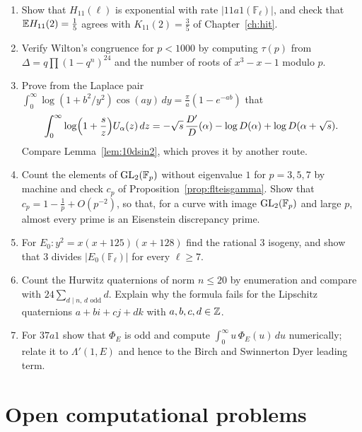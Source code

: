\begin{enumerate}
\item Show that $H_{11}(\ell)$ is exponential with rate $|11a1(\mathbb F_\ell)|$, and check that $\mathbb{E} H_{11}(2)=\frac15$ agrees with $K_{11}(2)=\frac35$ of Chapter~\ref{ch:hit}.
\item Verify Wilton's congruence for $p<1000$ by computing $\tau(p)$ from $\Delta=q\prod(1-q^n)^{24}$ and the number of roots of $x^3-x-1$ modulo $p$.
\item Prove from the Laplace pair $\int_0^\infty\log(1+b^2/y^2)\cos(ay)\,dy=\frac\pi a(1-e^{-ab})$ that\[\int_0^\infty\log\Bigl(1+\frac sz\Bigr)U_\alpha(z)\,dz=-\sqrt s\,\frac{D'}D(\alpha)-\log D(\alpha)+\log D(\alpha+\sqrt s).\]Compare Lemma~\ref{lem:10dsin2}, which proves it by another route.
\item Count the elements of $\mathrm{GL}_2(\mathbb F_p)$ without eigenvalue $1$ for $p=3,5,7$ by machine and check $c_p$ of Proposition~\ref{prop:flteisgamma}. Show that $c_p=1-\frac1p+O(p^{-2})$, so that, for a curve with image $\mathrm{GL}_2(\mathbb F_p)$ and large $p$, almost every prime is an Eisenstein discrepancy prime.
\item For $E_0:y^2=x(x+125)(x+128)$ find the rational $3$ isogeny, and show that $3$ divides $|E_0(\mathbb F_\ell)|$ for every $\ell\ge7$.
\item Count the Hurwitz quaternions of norm $n\le20$ by enumeration and compare with $24\sum_{d\mid n,\,d\text{ odd}}d$. Explain why the formula fails for the Lipschitz quaternions $a+bi+cj+dk$ with $a,b,c,d\in\mathbb{Z}$.
\item For $37a1$ show that $\Phi_E$ is odd and compute $\int_0^\infty u\,\Phi_E(u)\,du$ numerically; relate it to $\Lambda'(1,E)$ and hence to the Birch and Swinnerton Dyer leading term.
\end{enumerate}

\section{Open computational problems}

